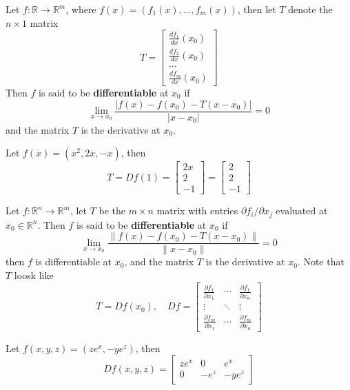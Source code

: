 \documentclass[openany]{book}
\newcommand{\R}{\mathbb{R}}
\begin{document}
\begin{defn}
    Let $f:\R\to\R^m$, where $f(x)=(f_1(x),\dots, f_m(x))$, then let $T$ denote the $n\times 1$ matrix 
    \begin{equation*}
        T=\begin{bmatrix}
            \frac{df_1}{dx}(x_0)\\
            \frac{df_2}{dx}(x_0)\\
            \dots\\
            \frac{df_m}{dx}(x_0)
        \end{bmatrix}
    \end{equation*}
    Then $f$ is said to be \textbf{differentiable} at $x_0$ if 
    \begin{equation*}
        \lim_{x\to x_0}\frac{|f(x)-f(x_0)-T(x-x_0)|}{|x-x_0|}=0
    \end{equation*}
    and the matrix $T$ is the derivative at $x_0$.
\end{defn}
\begin{example}
    Let $f(x)=(x^2, 2x, -x)$, then 
    \begin{equation*}
        T=Df(1)=\begin{bmatrix}
            2x\\
            2\\
            -1
        \end{bmatrix}=
        \begin{bmatrix}
            2\\
            2\\
            -1
        \end{bmatrix}
    \end{equation*}
\end{example}


\begin{defn}
    Let $f: \R^n\to\R^m$, let $T$ be the $m\times n$ matrix with entries $\partial f_i/\partial x_j$ evaluated at $x_0\in \R^n$. Then  $f$ is said to be \textbf{differentiable} at $x_0$ if 
    \begin{equation*}
        \lim_{x\to x_0}\frac{\|f(x)-f(x_0)-T(x-x_0)\|}{\|x-x_0\|}=0
    \end{equation*}
    then $f$ is differentiable at $x_0$, and the matrix $T$ is the derivative at $x_0$. Note that $T$ loosk like 
    \[
T=Df(x_0) , \quad Df=
\begin{bmatrix}
\frac{\partial f_1}{\partial x_1} & \cdots & \frac{\partial f_1}{\partial x_n} \\
\vdots & \ddots & \vdots \\
\frac{\partial f_m}{\partial x_1} & \cdots & \frac{\partial f_m}{\partial x_n}
\end{bmatrix}
\]
\end{defn}
\begin{example}
    Let $f(x,y,z)=(ze^x, -ye^z)$, then 
    \[
Df(x, y, z) = 
\begin{bmatrix}
ze^x & 0 & e^x \\
0 & -e^z & -ye^z
\end{bmatrix}
\]
\end{example}
\end{document}
